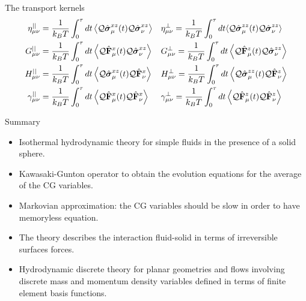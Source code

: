 \documentclass{beamer}
\begin{document}
\begin{frame}{The transport kernels}
\begin{align}
\eta^{||}_{\mu\nu}&
=\frac{1}{k_BT}\int_0^\tau  dt\left\langle 
{\cal Q}\hat{\boldsymbol{\sigma}}^{xz}_\mu(t){\cal Q}\hat{\boldsymbol{\sigma}}^{xz}_\nu
\right\rangle&&
\eta^{\bot}_{\mu\nu}
= \frac{1}{k_BT}\int_0^\tau  dt\langle 
{\cal Q}\hat{\boldsymbol{\sigma}}^{zz}_\mu(t)
{\cal Q}\hat{\boldsymbol{\sigma}}^{zz}_\nu\rangle
\nonumber\\
G^{||}_{\mu\nu}&
=\frac{1}{k_BT} \int_0^\tau  dt
\left\langle{\cal Q}\hat{\bf F}^{x}_\mu(t)
{\cal Q}\hat{\boldsymbol{\sigma}}^{xz}_\nu
\right\rangle&&
G^{\bot}_{\mu\nu}=\frac{1}{k_BT} \int_0^\tau  dt
\left\langle {\cal Q}\hat{\bf F}^{z}_\mu(t)
{\cal Q}\hat{\boldsymbol{\sigma}}^{zz}_\nu
\right\rangle
\nonumber\\
H^{||}_{\mu\nu}&
=\frac{1}{k_BT} 
\int_0^\tau  dt
\left\langle{\cal Q}\hat{\boldsymbol{\sigma}}^{xz}_\mu(t){\cal Q}\hat{\bf F}^{x}_\nu\right\rangle&&
H^\bot_{\mu\nu}=\frac{1}{k_BT} 
\int_0^\tau  dt\left\langle {\cal Q}\hat{\boldsymbol{\sigma}}^{zz}_\mu(t){\cal Q}\hat{\bf F}^{z}_\nu\right\rangle
\nonumber\\
\gamma^{||}_{\mu\nu}&=
\frac{1}{k_BT} \int_0^\tau  dt
\left\langle 
{\cal Q}\hat{\bf F}^{x}_\mu(t)
{\cal Q}\hat{\bf F}^{x}_\nu\right\rangle&&
\gamma^{\bot}_{\mu\nu}=
\frac{1}{k_BT} \int_0^\tau  dt\left\langle 
{\cal Q}\hat{\bf F}^{z}_\mu(t){\cal Q}\hat{\bf F}^{z}_\nu
\right\rangle
\nonumber
\end{align}
\end{frame}

\begin{frame}{Summary}
  \begin{itemize}
    \item \alert{Isothermal hydrodynamic theory} for simple fluids in the presence of a solid sphere. 
    \item Kawasaki-Gunton operator to obtain the evolution equations for the average of the CG variables. 
    \item Markovian approximation: the CG variables should be slow in order to have memoryless equation. 
    \item The theory describes the \alert{interaction fluid-solid} in terms of \alert{irreversible surfaces forces}.  
    \item \alert{Hydrodynamic discrete theory for planar geometries} and flows involving discrete mass and momentum density variables defined in terms of finite element basis functions. 
    \end{itemize}
\end{frame}
\end{document}
